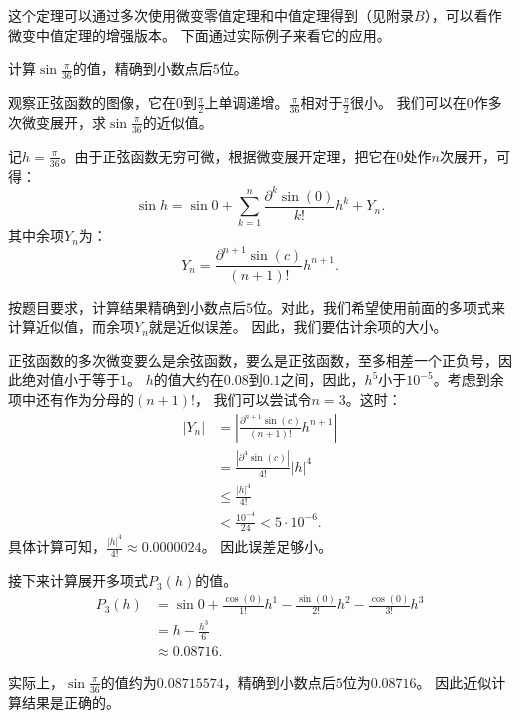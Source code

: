 \documentclass[12pt,UTF8,fontset=none]{ctexbook}
\begin{document}
这个定理可以通过多次使用微变零值定理和中值定理得到（见附录$B$），可以看作微变中值定理的增强版本。
下面通过实际例子来看它的应用。

\begin{et}
    计算$\sin{\frac{\pi}{36}}$的值，精确到小数点后$5$位。
\end{et}

\begin{so}
    观察正弦函数的图像，它在$0$到$\frac{\pi}{2}$上单调递增。$\frac{\pi}{36}$相对于$\frac{\pi}{2}$很小。
    我们可以在$0$作多次微变展开，求$\sin{\frac{\pi}{36}}$的近似值。

    记$h = \frac{\pi}{36}$。由于正弦函数无穷可微，根据微变展开定理，把它在$0$处作$n$次展开，可得：
    $$ \sin{h} = \sin{0} + \sum_{k=1}^n \frac{\partial^k \sin (0)}{k!}h^k + Y_n. $$
    其中余项$Y_n$为：
    $$ Y_n = \frac{\partial^{n+1} \sin (c)}{(n+1)!}h^{n+1}. $$

    按题目要求，计算结果精确到小数点后$5$位。对此，我们希望使用前面的多项式来计算近似值，而余项$Y_n$就是近似误差。
    因此，我们要估计余项的大小。
    
    正弦函数的多次微变要么是余弦函数，要么是正弦函数，至多相差一个正负号，因此绝对值小于等于$1$。
    $h$的值大约在$0.08$到$0.1$之间，因此，$h^5$小于$10^{-5}$。考虑到余项中还有作为分母的$(n+1)!$，
    我们可以尝试令$n=3$。这时：
    \begin{align*}
        | Y_n| &= \left|\frac{\partial^{n+1} \sin (c)}{(n+1)!}h^{n+1}\right|  \\
        &= \frac{\left|\partial^{4} \sin (c)\right|}{4!}|h|^4  \\
        &\leqslant \frac{|h|^4}{4!}  \\
        &< \frac{10^{-4}}{24} < 5 \cdot 10^{-6}. 
    \end{align*}
    具体计算可知，$\frac{|h|^4}{4!} \approx 0.0000024$。
    因此误差足够小。


    接下来计算展开多项式$P_3(h)$的值。
    \begin{align*}
        P_3(h) &= \sin{0} + \frac{\cos (0)}{1!}h^1 - \frac{\sin (0)}{2!}h^2 - \frac{\cos (0)}{3!}h^3  \\
        &= h - \frac{h^3}{6}  \\
        &\approx 0.08716. 
    \end{align*}
    
    实际上，$\sin{\frac{\pi}{36}}$的值约为$0.08715574$，精确到小数点后$5$位为$0.08716$。
    因此近似计算结果是正确的。
\end{so}
\end{document}
